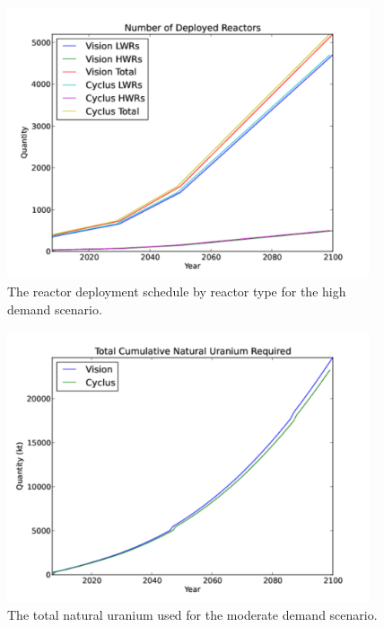 \begin{figure}
  \begin{center}
    \includegraphics[height=8cm]{./figs/rxtrs_high.pdf}
    \caption{The reactor deployment schedule by reactor type for the high demand scenario.}
    \label{fig:rxtrs_high}
  \end{center}  
\end{figure}

\begin{figure}
\begin{center}
  \includegraphics[height=8cm]{./figs/nat_u_low.pdf}
  \caption{The total natural uranium used for the moderate demand scenario.}
  \label{fig:nat_u_low}
\end{center}  
\end{figure}

